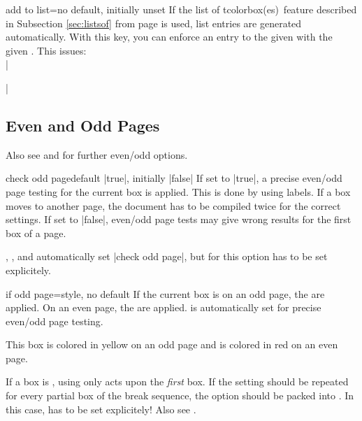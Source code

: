 \begin{docTcbKey}{add to list}{=}{no default, initially unset}
If the \flqq list of tcolorbox(es)\frqq\ feature described in Subsection
\ref{sec:listsof} from page \pageref{sec:listsof} is used, list entries are
generated automatically. With this key, you can enforce an entry to the
given  with the given .
This issues:\\
|\addcontentsline|
\end{docTcbKey}

\subsection{Even and Odd Pages}

\begin{marker}
Also see
 and
for further even/odd options.
\end{marker}

\begin{docTcbKey}[][doc updated=2015-11-13]{check odd page}{}{default |true|, initially |false|}
If set to |true|, a precise even/odd page testing for the current box
is applied. This is done by using labels. If a box moves to another page,
the document has to be compiled twice for the correct settings.
If set to |false|, even/odd page tests may give wrong results for the first box
of a page.

,
, and
automatically set |check odd page|, but for
 this option has to be set explicitely.
\end{docTcbKey}

\enlargethispage*{1cm}
\begin{docTcbKey}[][doc new=2015-11-13]{if odd page}{=}{style, no default}
If the current box is on an odd page, the  are applied.
On an even page, the  are applied.
 is automatically set for precise even/odd page testing.

\begin{dispExample}
\begin{tcolorbox}[if odd page={colback=yellow!50}{colback=red!50}]
  This box is colored in yellow on an odd page
  and is colored in red on an even page.
\end{tcolorbox}
\end{dispExample}

\begin{marker}
If a box is , using 
only acts upon the \emph{first} box. If the setting should be
repeated for every partial box of the break sequence, the option should be
packed into . In this case, 
has to be set explicitely! Also see .
\end{marker}
\end{docTcbKey}

